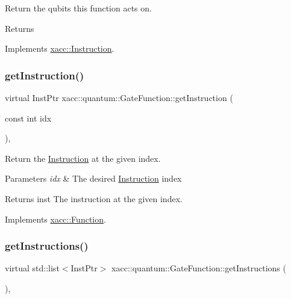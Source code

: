Return the qubits this function acts on. \begin{DoxyReturn}{Returns}

\end{DoxyReturn}


Implements \hyperlink{a02460_a819f32e94c3e1c9e69a0061aaf8d86dc}{xacc\+::\+Instruction}.

\mbox{\label{a01272_a841d656eed8aa9b4c0eec3f1da38069c}} 
\subsubsection{\texorpdfstring{get\+Instruction()}{getInstruction()}}
{\footnotesize\ttfamily virtual Inst\+Ptr xacc\+::quantum\+::\+Gate\+Function\+::get\+Instruction (\begin{DoxyParamCaption}\item[{const int}]{idx }\end{DoxyParamCaption})\hspace{0.3cm}{\ttfamily [inline]}, {\ttfamily [virtual]}}

Return the \hyperlink{a02460}{Instruction} at the given index.


\begin{DoxyParams}{Parameters}
{\em idx} & The desired \hyperlink{a02460}{Instruction} index \\
\hline
\end{DoxyParams}
\begin{DoxyReturn}{Returns}
inst The instruction at the given index. 
\end{DoxyReturn}


Implements \hyperlink{a02456_afa549fc91b5a05f26d8139954a7e0ed5}{xacc\+::\+Function}.

\mbox{\label{a01272_aebce6a9e64aed7f4aff86df752bacfe2}} 
\subsubsection{\texorpdfstring{get\+Instructions()}{getInstructions()}}
{\footnotesize\ttfamily virtual std\+::list$<$Inst\+Ptr$>$ xacc\+::quantum\+::\+Gate\+Function\+::get\+Instructions (\begin{DoxyParamCaption}{ }\end{DoxyParamCaption})\hspace{0.3cm}{\ttfamily [inline]}, {\ttfamily [virtual]}}


